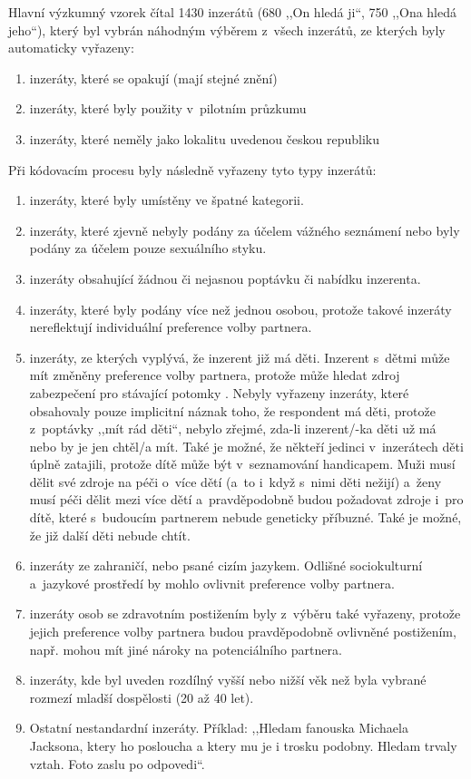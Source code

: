 \documentclass[a4paper, 12pt, notitlepage, oneside, numbers=noenddot]{report}
\begin{document}
Hlavní výzkumný vzorek čítal 1430 inzerátů (680 ,,On hledá ji``, 750
,,Ona hledá jeho``), který byl vybrán náhodným výběrem z~všech
inzerátů, ze kterých byly automaticky vyřazeny:

\begin{enumerate}
\item inzeráty, které se opakují (mají stejné znění)
\item inzeráty, které byly použity v~pilotním průzkumu
\item inzeráty, které neměly jako lokalitu uvedenou českou republiku
\end{enumerate}
Při kódovacím procesu byly následně vyřazeny tyto typy inzerátů:

\begin{enumerate}
\item inzeráty, které byly umístěny ve špatné kategorii.
\item inzeráty, které zjevně nebyly podány za účelem vážného seznámení
  nebo byly podány za účelem pouze sexuálního styku.
\item inzeráty obsahující žádnou či nejasnou poptávku či nabídku
  inzerenta.
\item inzeráty, které byly podány více než jednou osobou, protože
  takové inzeráty nereflektují individuální preference volby partnera.
\item inzeráty, ze kterých vyplývá, že inzerent již má děti. Inzerent
  s~dětmi může mít změněny preference volby partnera, protože může
  hledat zdroj zabezpečení pro stávající potomky
  \citep{WayfordDunbar1995}.  Nebyly vyřazeny inzeráty, které
  obsahovaly pouze implicitní náznak toho, že respondent má děti,
  protože z~poptávky ,,mít rád děti``, nebylo zřejmé, zda-li
  inzerent/-ka děti už má nebo by je jen chtěl/a mít.  Také je možné,
  že někteří jedinci v~inzerátech děti úplně zatajili, protože dítě
  může být v~seznamování handicapem.  Muži musí dělit své zdroje na
  péči o~více dětí (a~to i~když s~nimi děti nežijí) a~ženy musí péči
  dělit mezi více dětí a~pravděpodobně budou požadovat zdroje i~pro
  dítě, které s~budoucím partnerem nebude geneticky příbuzné. Také je
  možné, že již další děti nebude chtít.
\item inzeráty ze zahraničí, nebo psané cizím jazykem.  Odlišné
  sociokulturní a~jazykové prostředí by mohlo ovlivnit preference
  volby partnera.
\item inzeráty osob se zdravotním postižením byly z~výběru také
  vyřazeny, protože jejich preference volby partnera budou
  pravděpodobně ovlivněné postižením, např. mohou mít jiné nároky na
  potenciálního partnera.
\item inzeráty, kde byl uveden rozdílný vyšší nebo nižší věk než byla
  vybrané rozmezí mladší dospělosti (20 až 40 let).
\item Ostatní nestandardní inzeráty.  Příklad: ,,Hledam fanouska
  Michaela Jacksona, ktery ho posloucha a ktery mu je i trosku
  podobny. Hledam trvaly vztah. Foto zaslu po odpovedi``.
\end{enumerate}
\end{document}
